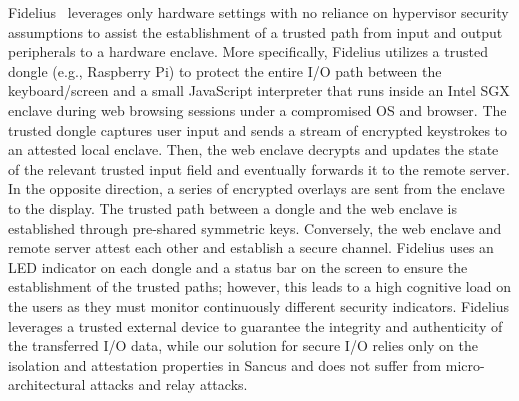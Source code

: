 Fidelius~\cite{eskandarian2019fidelius} leverages only hardware settings with no
reliance on hypervisor security assumptions to assist the establishment of a
trusted path from input and output peripherals to a hardware enclave. More
specifically, Fidelius utilizes a trusted dongle (e.g., Raspberry Pi) to protect
the entire I/O path between the keyboard/screen and a small JavaScript
interpreter that runs inside an Intel \ac{SGX} enclave during web browsing
sessions under a compromised OS and browser. The trusted dongle captures user
input and sends a stream of encrypted keystrokes to an attested local enclave.
Then, the web enclave decrypts and updates the state of the relevant trusted
input field and eventually forwards it to the remote server. In the opposite
direction, a series of encrypted overlays are sent from the enclave to the
display. The trusted path between a dongle and the web enclave is established
through pre-shared symmetric keys. Conversely, the web enclave and remote server
attest each other and establish a secure channel. Fidelius uses an LED indicator
on each dongle and a status bar on the screen to ensure the establishment of the
trusted paths; however, this leads to a high cognitive load on the users as they
must monitor continuously different security indicators. Fidelius leverages a
trusted external device to guarantee the integrity and authenticity of the
transferred I/O data, while our solution for secure I/O relies only on the
isolation and attestation properties in Sancus and does not suffer from
micro-architectural attacks and relay attacks.

